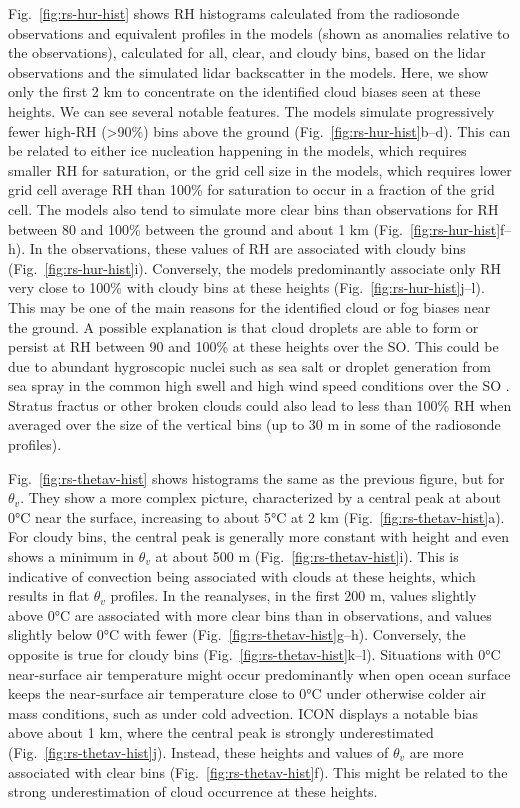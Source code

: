 \documentclass[draft]{agujournal2019}
\begin{document}
Fig.~\ref{fig:rs-hur-hist} shows RH histograms calculated from the radiosonde observations and equivalent profiles in the models (shown as anomalies relative to the observations), calculated for all, clear, and cloudy bins, based on the lidar observations and the simulated lidar backscatter in the models. Here, we show only the first 2 km to concentrate on the identified cloud biases seen at these heights. We can see several notable features. The models simulate progressively fewer high-RH (\textgreater 90\%) bins above the ground (Fig.~\ref{fig:rs-hur-hist}b--d). This can be related to either ice nucleation happening in the models, which requires smaller RH for saturation, or the grid cell size in the models, which requires lower grid cell average RH than 100\% for saturation to occur in a fraction of the grid cell. The models also tend to simulate more clear bins than observations for RH between 80 and 100\% between the ground and about 1 km (Fig.~\ref{fig:rs-hur-hist}f--h). In the observations, these values of RH are associated with cloudy bins (Fig.~\ref{fig:rs-hur-hist}i). Conversely, the models predominantly associate only RH very close to 100\% with cloudy bins at these heights (Fig.~\ref{fig:rs-hur-hist}j--l). This may be one of the main reasons for the identified cloud or fog biases near the ground. A possible explanation is that cloud droplets are able to form or persist at RH between 90 and 100\% at these heights over the SO. This could be due to abundant hygroscopic nuclei such as sea salt \cite{zieger2017,kong2018} or droplet generation from sea spray in the common high swell and high wind speed conditions over the SO \cite{revell2019,hartery2020}. Stratus fractus or other broken clouds could also lead to less than 100\% RH when averaged over the size of the vertical bins (up to 30 m in some of the radiosonde profiles).

Fig.~\ref{fig:rs-thetav-hist} shows histograms the same as the previous figure, but for $\theta_v$. They show a more complex picture, characterized by a central peak at about 0°C near the surface, increasing to about 5°C at 2 km (Fig.~\ref{fig:rs-thetav-hist}a). For cloudy bins, the central peak is generally more constant with height and even shows a minimum in $\theta_v$ at about 500 m (Fig.~\ref{fig:rs-thetav-hist}i). This is indicative of convection being associated with clouds at these heights, which results in flat $\theta_v$ profiles. In the reanalyses, in the first 200 m, values slightly above 0°C are associated with more clear bins than in observations, and values slightly below 0°C with fewer (Fig.~\ref{fig:rs-thetav-hist}g--h). Conversely, the opposite is true for cloudy bins (Fig.~\ref{fig:rs-thetav-hist}k--l). Situations with 0°C near-surface air temperature might occur predominantly when open ocean surface keeps the near-surface air temperature close to 0°C under otherwise colder air mass conditions, such as under cold advection. ICON displays a notable bias above about 1 km, where the central peak is strongly underestimated (Fig.~\ref{fig:rs-thetav-hist}j). Instead, these heights and values of $\theta_v$ are more associated with clear bins (Fig.~\ref{fig:rs-thetav-hist}f). This might be related to the strong underestimation of cloud occurrence at these heights.
\end{document}
